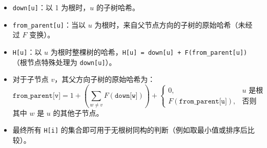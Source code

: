 \begin{itemize}
\item \texttt{down[u]}：以 1 为根时，$u$ 的子树哈希。
\item \texttt{from\_parent[u]}：当以 $u$ 为根时，来自父节点方向的子树的原始哈希（未经过 $F$ 变换）。
\item \texttt{H[u]}：以 $u$ 为根时整棵树的哈希，\texttt{H[u] = down[u] + F(from\_parent[u])}（根节点特殊处理为 \texttt{down[u]}）。
\item 对于子节点 $v$，其父方向子树的原始哈希为：
  \[
  \texttt{from\_parent[v]} = 1 + \left(\sum_{w \neq v} F(\texttt{down[w]})\right) + \begin{cases}
  0, & u \text{ 是根}\\
  F(\texttt{from\_parent[u]}), & \text{否则}
  \end{cases}
  \]
  其中 $w$ 是 $u$ 的其他子节点。
\item 最终所有 \texttt{H[i]} 的集合即可用于无根树同构的判断（例如取最小值或排序后比较）。
\end{itemize}
